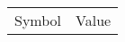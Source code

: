 \begin{tabular}{cl}
\hline
  Symbol  & Value                                                                                                                                                                                                                                                                                                                                                                                                                                                                                                                                                                                                                                                                                                                                                                                                                                                                                                                                                                                                                                                                                                                                                                                                                                                                                                                                                                                                                                                                                                                                                                                                                                                                                                                                                                                                                                                                                                                                                                                                                                                                                                                                                                                                                                                                                                                                                                                                                                                                                                                                                                                                                                                                                                                                                                                                                                                                                                                                                                                                                                                                                                                                                                                                                                                                                                                                                            
\end{tabular}
